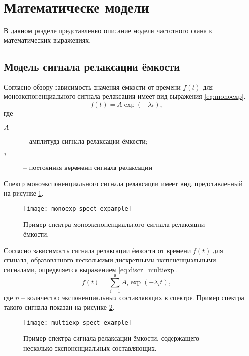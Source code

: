 \section{Математическе модели}

    В данном разделе представленно описание модели частотного скана 
    в математических выражениях.


    \subsection{Модель сигнала релаксации ёмкости}

    Согласно обзору \cite{istratov_exp_analysis} зависимость значения
    ёмкости от времени $f(t)$ для моноэкспоненциального сигнала релаксации
    имеет вид выражения \ref{eq:monoexp}.
    \begin{equation}
        \label{eq:monoexp}
        f(t) = A \exp \left(-\lambda t\right) ,
    \end{equation}
    где
    \begin{description}
        \item[\(A\)] -- амплитуда сигнала релаксации ёмкости;
        \item[\(\tau\)] -- постоянная веремени сигнала релаксации.
    \end{description}
    Спектр моноэкспоненциального сигнала релаксации имеет вид, 
    представленный на рисунке \ref{pic:monoexp_spect_example}.
    \begin{figure}[ht]
        \centering
        \texttt{[image: monoexp\_spect\_expample]}
        \caption{Пример спектра моноэкспоненциального сигнала релаксации
        ёмкости.}
        \label{pic:monoexp_spect_example}
    \end{figure}

    Согласно \cite{istratov_exp_analysis} зависимость сигнала релаксации
    ёмкости от времени $f(t)$ для сгинала, образованного несколькими
    дискретными экспоненциальными сигналами, определяется выражением 
    \ref{eq:discr_multiexp}.
    \begin{equation}
        \label{eq:discr_multiexp}
        f(t) = \sum_{i=1}^{n}A_i\exp\left(-\lambda_i t\right) ,
    \end{equation}
    где $n$ -- количество экспоненциальных составляющих в спектре.
    Пример спектра такого сигнала показан на рисунке 
    \ref{pic:multiexp_spect_example}.
    \begin{figure}[ht]
        \centering
        \texttt{[image: multiexp\_spect\_example]}
        \caption{Пример спектра сигнала релаксации ёмкости, содержащего
        несколько экспоненциальных составляющих.}
        \label{pic:multiexp_spect_example}
    \end{figure}


